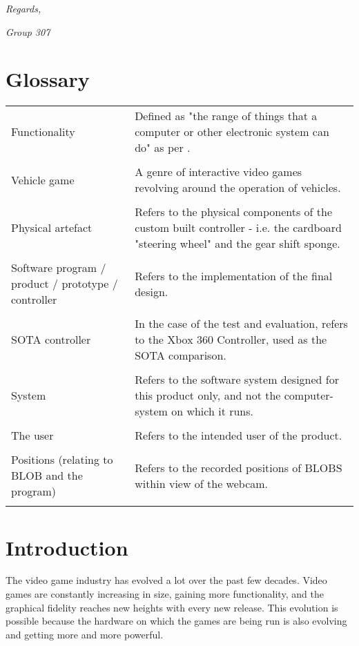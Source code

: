 \noindent\textit{Regards,}

\noindent\textit{Group 307}

\clearpage

\section{Glossary}
\begin{table}[!htbp]
\begin{tabular}{p{2in} p{3.4in}}
Functionality & Defined as "the range of things that a computer or other electronic system can do" as per \parencite{Macmillan2005}.\\
&\\
Vehicle game & A genre of interactive video games revolving around the operation of vehicles.\\
 & \\
Physical artefact & Refers to the physical components of the custom built controller - i.e. the cardboard "steering wheel" and the gear shift sponge.\\
 & \\
Software program / product / prototype / controller & Refers to the implementation of the final design.\\
 & \\
SOTA controller & In the case of the test and evaluation, refers to the Xbox 360 Controller, used as the SOTA comparison.\\
 & \\
System & Refers to the software system designed for this product only, and not the computer-system on which it runs.\\
 & \\
The user & Refers to the intended user of the product.\\
 & \\
Positions (relating to BLOB and the program) & Refers to the recorded positions of BLOBS within view of the webcam.\\
 & \\
 
\end{tabular}
\end{table}

\clearpage

\section{Introduction}
The video game industry has evolved a lot over the past few decades. Video games are constantly increasing in size, gaining more functionality, and the graphical fidelity reaches new heights with every new release. This evolution is possible because the hardware on which the games are being run is also evolving and getting more and more powerful.
\bigskip

